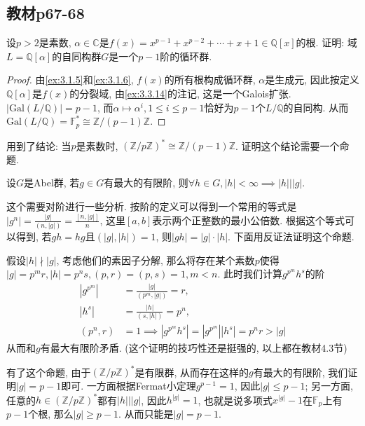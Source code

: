 \subsection{教材p67-68}

\begin{problem}\label{ex:3.4.1}
    设$p > 2$是素数, $\alpha \in \mathbb{C}$是$f(x) = x^{p - 1} + x^{p - 2} + \cdots + x + 1 \in \mathbb{Q}[x]$的根. 证明: 域$L = \mathbb{Q}[\alpha]$的自同构群$G$是一个$p - 1$阶的循环群.
\end{problem}

\begin{proof}
    由\ref{ex:3.1.5}和\ref{ex:3.1.6}, $f(x)$的所有根构成循环群, $\alpha$是生成元, 因此按定义$\mathbb{Q}[\alpha]$是$f(x)$的分裂域, 由\ref{ex:3.3.14}的注记, 这是一个Galois扩张. $|\mathrm{Gal}(L/\mathbb{Q})| = p - 1$, 而$\alpha \mapsto \alpha^i, 1 \leqslant i \leqslant p - 1$恰好为$p - 1$个$L/\mathbb{Q}$的自同构. 从而$\mathrm{Gal}(L/\mathbb{Q}) = \mathbb{F}_p^* \cong \mathbb{Z}/(p - 1)\mathbb{Z}$.
\end{proof}

\begin{remark}
    用到了结论: 当$p$是素数时, $(\mathbb{Z}/p\mathbb{Z})^* \cong \mathbb{Z}/(p - 1)\mathbb{Z}$. 证明这个结论需要一个命题.
    \begin{propstar}
        设$G$是Abel群, 若$g \in G$有最大的有限阶, 则$\forall h \in G, |h| < \infty \implies |h| \big| |g|$.
    \end{propstar}
    这个需要对阶进行一些分析. 按阶的定义可以得到一个常用的等式是$|g^n| = \frac{|g|}{(n, |g|)} = \frac{[n, |g|]}{n}$, 这里$[a, b]$表示两个正整数的最小公倍数. 根据这个等式可以得到, 若$gh = hg$且$(|g|, |h|) = 1$, 则$|gh| = |g| \cdot |h|$. 下面用反证法证明这个命题.
    
    假设$|h| \nmid |g|$, 考虑他们的素因子分解, 那么将存在某个素数$p$使得$|g| = p^mr, |h| = p^ns, (p, r) = (p, s) = 1, m < n$. 此时我们计算$g^{p^m}h^s$的阶
    \[
    \begin{aligned}
        |g^{p^m}| &= \frac{|g|}{(p^m, |g|)} = r,\\
        |h^s| &= \frac{|h|}{(s, |h|)} = p^n,\\
        (p^n, r) &= 1 \implies |g^{p^m}h^s| = |g^{p^m}||h^s| = p^nr > |g|
    \end{aligned}
    \]
    从而和$g$有最大有限阶矛盾. (这个证明的技巧性还是挺强的, 以上都在教材4.3节)

    有了这个命题, 由于$(\mathbb{Z}/p\mathbb{Z})^*$是有限群, 从而存在这样的$g$有最大的有限阶, 我们证明$|g| = p - 1$即可. 一方面根据Fermat小定理$g^{p - 1} = 1$, 因此$|g| \leqslant p - 1$; 另一方面, 任意的$h \in (\mathbb{Z}/p\mathbb{Z})^*$都有$|h| \big| |g|$, 因此$h^{|g|} = 1$, 也就是说多项式$x^{|g|} - 1$在$\mathbb{F}_p$上有$p - 1$个根, 那么$|g| \geqslant p - 1$. 从而只能是$|g| = p - 1$.
\end{remark}

